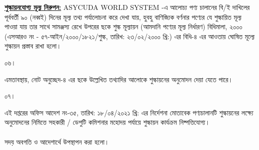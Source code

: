 \documentclass[12pt]{article}
\newcommand{\srofs}{এসআরও নং - ৫৭-আইন/২০০০/১৮২১/শুল্ক}
\newcommand{\srofsd}{তারিখ: ২৩/০২/২০০০ খ্রি:}
\begin{document}
\begin{minipage}[t]{0.95\linewidth}
\underline{\textbf{শুল্কায়নযোগ্য মূল্য নিরুপন:}} ASYCUDA WORLD SYSTEM
-এ আলোচ্য পণ্য চালানের বি/ই দাখিলের পূর্ববর্তী ৯০ (নব্বই) দিনের
মূল্য তথ্য পর্যালোচনা করে দেখা যায়, হুবহু বাণিজ্যিক বর্ণনার পণ্যের যে
শুল্কায়িত মূল্য পাওয়া যায় তার সাথে সামঞ্জস্য রেখে উপরের ছকে শুল্ক
মূল্যায়ন (আমদানি পণ্যের মূল্য নির্ধারণ) বিধিমালা, ২০০০
({\srofs}, {\srofsd})
এর বিধি-৪ এর আওতায় ঘোষিত মূল্যে শুল্কায়ন প্রস্তাব রাখা হলো।
\\
\end{minipage}
\begin{minipage}[t]{0.05\linewidth}
০৬।
\end{minipage}
\begin{minipage}[t]{0.95\linewidth}
এমতাবস্থায়, নোট অনুচ্ছেদ-৪ এর ছকে উল্লেখিত
তথ্যাদির আলোকে শুল্কায়নের অনুমোদন দেয়া যেতে
পারে।
\\
\end{minipage}
\begin{minipage}[t]{0.05\linewidth}
০৭।
\end{minipage}
\begin{minipage}[t]{0.95\linewidth}
এই দপ্তরের অফিস আদেশ নং-৩৫,
তারিখ: ১৮/০৪/২০২১ খ্রি: এর নির্দেশনা
মোতাবেক পণ্যচালানটি শুল্কায়নের লক্ষ্যে
অনুমোদনের নিমিত্তে সহকারী / ডেপুটি কমিশনার
মহোদয় পর্যায়ে শুল্কায়ন কার্যক্রম নিষ্পত্তিযোগ্য।
\\
\\
সদয় অবগতি ও আদেশার্থে উপস্থাপন করা
হলো।
\end{minipage}
\end{document}
